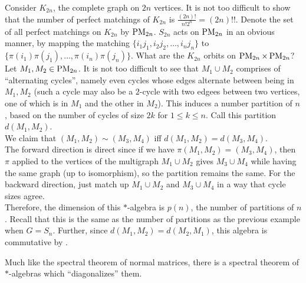 	\begin{fex}
		Consider $K_{2n}$, the complete graph on $2n$ vertices. It is not too difficult to show that the number of perfect matchings of $K_{2n}$ is $\frac{(2n)!}{n!2^n} = (2n)!!$. Denote the set of all perfect matchings on $K_{2n}$ by $\operatorname{PM}_{2n}$. $S_{2n}$ acts on $\operatorname{PM}_{2n}$ in an obvious manner, by mapping the matching $\{i_1j_1,i_2j_2,\ldots,i_nj_n\}$ to $\{\pi(i_1)\pi(j_1),\ldots,\pi(i_n)\pi(j_n)\}$. What are the $K_{2n}$ orbits on $\operatorname{PM}_{2n} \times \operatorname{PM}_{2n}$?\\
		Let $M_1,M_2 \in \operatorname{PM}_{2n}$. It is not too difficult to see that $M_1 \cup M_2$ comprises of ``alternating cycles'', namely even cycles whose edges alternate between being in $M_1,M_2$ (such a cycle may also be a $2$-cycle with two edgees between two vertices, one of which is in $M_1$ and the other in $M_2$).  This induces a number partition of $n$, based on the number of cycles of size $2k$ for $1 \le k \le n$. Call this partition $d(M_1,M_2)$.\\
		
		We claim that $(M_1,M_2) \sim (M_3,M_4)$ iff $d(M_1,M_2) = d(M_3,M_4)$.\\
		The forward direction is direct since if we have $\pi (M_1,M_2) = (M_3,M_4)$, then $\pi$ applied to the vertices of the multigraph $M_1 \cup M_2$ gives $M_3 \cup M_4$ while having the same graph (up to isomorphism), so the partition remains the same. For the backward direction, just match up $M_1 \cup M_2$ and $M_3 \cup M_4$ in a way that cycle sizes agree.\\

		Therefore, the dimension of this $*$-algebra is $p(n)$, the number of partitions of $n$. Recall that this is the same as the number of partitions as the previous example when $G = S_n$. Further, since $d(M_1,M_2) = d(M_2,M_1)$, this algebra is commutative by .
	\end{fex}

	Much like the spectral theorem of normal matrices, there is a spectral theorem of $*$-algebras which ``diagonalizes'' them.

